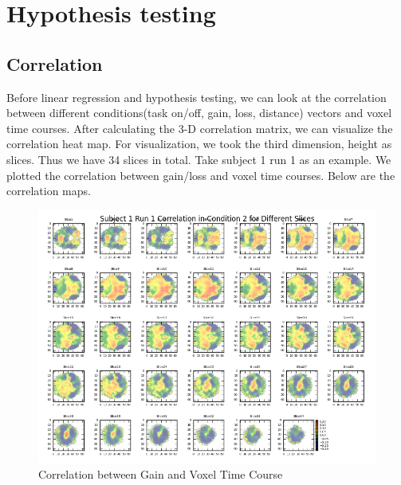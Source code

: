 \section {Hypothesis testing}
\subsection{Correlation}
\noindent
Before linear regression and hypothesis testing, we can look at the correlation between different conditions(task on/off, gain, loss, distance) vectors and voxel time courses. After calculating the 3-D correlation matrix, we can visualize the correlation heat map.  For visualization, we took the third dimension, height as slices. Thus we have 34 slices in total. Take subject 1  run 1 as an example.
We plotted the correlation between gain/loss and voxel time courses. Below are the correlation maps.

        

\begin{figure}[H]
    \centering
        \includegraphics[scale=0.5]{../plots/correlation_s1r1c2.png}
    \caption{Correlation between Gain and Voxel Time Course}
\end{figure}


